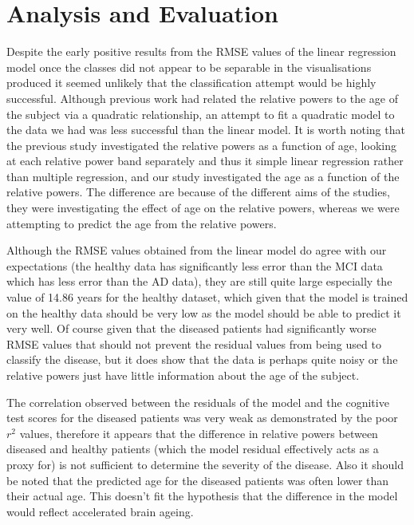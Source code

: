\chapter{Analysis and Evaluation}

Despite the early positive results from the RMSE values of the linear regression model once the classes did not appear to be separable in the visualisations produced it seemed unlikely that the classification attempt would be highly successful. Although previous work \cite{Gomez2013} had related the relative powers to the age of the subject via a quadratic relationship, an attempt to fit a quadratic model to the data we had was less successful than the linear model. It is worth noting that the previous study investigated the relative powers as a function of age, looking at each relative power band separately and thus it simple linear regression rather than multiple regression, and our study investigated the age as a function of the relative powers. The difference are because of the different aims of the studies, they were investigating the effect of age on the relative powers, whereas we were attempting to predict the age from the relative powers.

Although the RMSE values obtained from the linear model do agree with our expectations (the healthy data has significantly less error than the MCI data which has less error than the AD data), they are still quite large especially the value of 14.86 years for the healthy dataset, which given that the model is trained on the healthy data should be very low as the model should be able to predict it very well. Of course given that the diseased patients had significantly worse RMSE values that should not prevent the residual values from being used to classify the disease, but it does show that the data is perhaps quite noisy or the relative powers just have little information about the age of the subject.

The correlation observed between the residuals of the model and the cognitive test scores for the diseased patients was very weak as demonstrated by the poor $r^2$ values, therefore it appears that the difference in relative powers between diseased and healthy patients (which the model residual effectively acts as a proxy for) is not sufficient to determine the severity of the disease. Also it should be noted that the predicted age for the diseased patients was often lower than their actual age. This doesn't fit the hypothesis that the difference in the model would reflect accelerated brain ageing.

